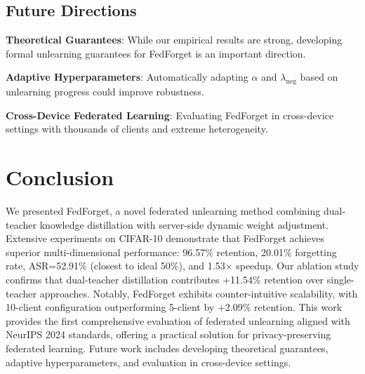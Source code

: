 \documentclass[11pt,a4paper]{article}
\begin{document}
\subsection{Future Directions}

\textbf{Theoretical Guarantees}: While our empirical results are strong, developing formal unlearning guarantees for FedForget is an important direction.

\textbf{Adaptive Hyperparameters}: Automatically adapting $\alpha$ and $\lambda_{\text{neg}}$ based on unlearning progress could improve robustness.

\textbf{Cross-Device Federated Learning}: Evaluating FedForget in cross-device settings with thousands of clients and extreme heterogeneity.

\section{Conclusion}

We presented FedForget, a novel federated unlearning method combining dual-teacher knowledge distillation with server-side dynamic weight adjustment. Extensive experiments on CIFAR-10 demonstrate that FedForget achieves superior multi-dimensional performance: 96.57\% retention, 20.01\% forgetting rate, ASR=52.91\% (closest to ideal 50\%), and 1.53× speedup. Our ablation study confirms that dual-teacher distillation contributes +11.54\% retention over single-teacher approaches. Notably, FedForget exhibits counter-intuitive scalability, with 10-client configuration outperforming 5-client by +2.09\% retention. This work provides the first comprehensive evaluation of federated unlearning aligned with NeurIPS 2024 standards, offering a practical solution for privacy-preserving federated learning. Future work includes developing theoretical guarantees, adaptive hyperparameters, and evaluation in cross-device settings.



\end{document}
